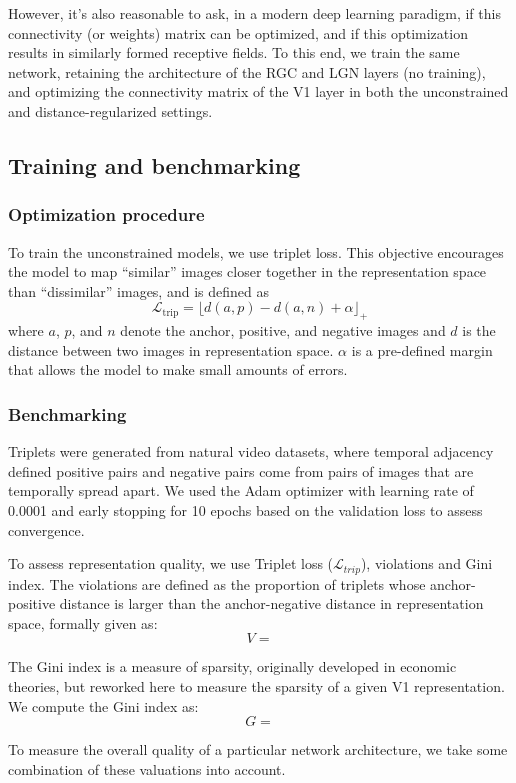 \documentclass[10pt]{article}
\begin{document}
However, it's also reasonable to ask, in a modern deep learning paradigm, if this connectivity (or weights) matrix can be optimized, and if this optimization results in similarly 
formed receptive fields. To this end, we train the same network, retaining the architecture of the RGC and LGN layers (no training), and optimizing the connectivity matrix of the V1
layer in both the unconstrained and distance-regularized settings.

\subsection{Training and benchmarking}

\subsubsection{Optimization procedure}
To train the unconstrained models, we use triplet loss. This objective encourages the model to map ``similar'' images closer together in the representation space than ``dissimilar'' 
images, and is defined as
$$
\mathcal{L}_\text{trip} = \lfloor d(a,p)-d(a,n) + \alpha \rfloor_+
$$
where $a$, $p$, and $n$ denote the anchor, positive, and negative images and $d$ is the distance between two images in representation space. $\alpha$ is a pre-defined margin that allows
the model to make small amounts of errors.

\subsubsection{Benchmarking}
Triplets were generated from natural video datasets, where temporal adjacency defined positive pairs and negative pairs come from pairs of images that are temporally spread apart. 
We used the Adam optimizer with learning rate of 0.0001 and early stopping for 10 epochs based on the validation loss to assess convergence.

To assess representation quality, we use Triplet loss ($\mathcal{L}_{trip}$), violations and Gini index. The violations are defined as the proportion of triplets whose anchor-positive distance is larger
than the anchor-negative distance in representation space, formally given as:
$$
V=
$$

The Gini index is a measure of sparsity, originally developed in economic theories, but reworked here to measure the sparsity of a given V1 representation. We compute the Gini index as:
$$
G=
$$

To measure the overall quality of a particular network architecture, we take some combination of these valuations into account.
\end{document}
